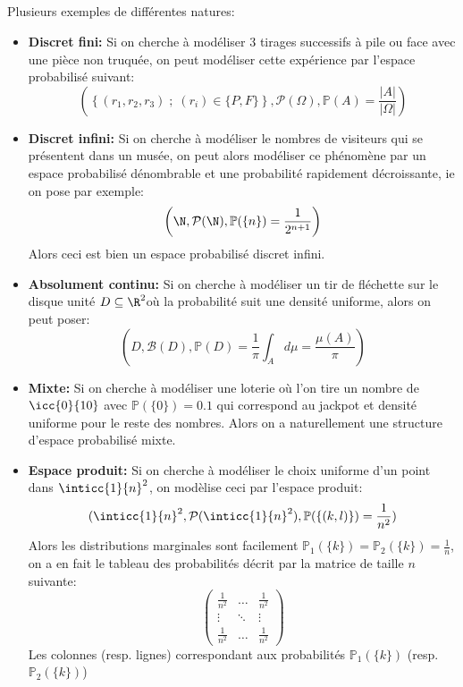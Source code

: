 \subsection*{}
Plusieurs exemples de différentes natures:
\begin{itemize}
   \item \textbf{Discret fini:} Si on cherche à modéliser 3 tirages successifs à pile ou face avec une pièce non truquée, on peut modéliser cette expérience par l'espace probabilisé suivant:
   \[ 
      \left(\left\{ (r_1, r_2, r_3) \; ; \; (r_i) \in \{P, F\}\right\}, \mathcal{P}( \Omega), \mathbb{P}(A) = \frac{|A|}{| \Omega|} \right)
   \]
   \item  \textbf{Discret infini:} Si on cherche à modéliser le nombres de visiteurs qui se présentent dans un musée, on peut alors modéliser ce phénomène par un espace probabilisé dénombrable et une probabilité rapidement décroissante, ie on pose par exemple:
   \[ 
      \left(\N, \mathcal{P}( \N), \mathbb{P}(\{n\}) = \frac{1}{2^{n+1}  } \right)
   \]
   Alors ceci est bien un espace probabilisé discret infini.
   \item \textbf{Absolument continu:} Si on cherche à modéliser un tir de fléchette sur le disque unité \( D \subseteq \R^2 \)où la probabilité suit une densité uniforme, alors on peut poser:
   \[ 
      \left( D, \mathcal{B}(D), \mathbb{P}(D) = \frac{1}{ \pi}\int_A d \mu = \frac{ \mu(A)}{ \pi}\right)
   \]
   \item \textbf{Mixte:} Si on cherche à modéliser une loterie où l'on tire un nombre de \( \icc{0}{10} \) avec \( \mathbb{P}(\{0\}) = 0.1 \) qui correspond au jackpot et densité uniforme pour le reste des nombres. Alors on a naturellement une structure d'espace probabilisé mixte.
   \item \textbf{Espace produit:} Si on cherche à modéliser le choix uniforme d'un point dans \( \inticc{1}{n}^2 \), on modèlise ceci par l'espace produit:
   \[ 
      (\inticc{1}{n}^2, \mathcal{P}(\inticc{1}{n}^2), \mathbb{P}(\{(k, l)\}) = \frac{1}{n^2}) 
   \]
   Alors les distributions marginales sont facilement \( \mathbb{P}_1(\{k\}) = \mathbb{P}_2(\{k\}) = \frac{1}{n} \), on a en fait le tableau des probabilités décrit par la matrice de taille \( n \) suivante:
   \[ 
      \begin{pmatrix}                   
         \frac{1}{n^2} & \ldots & \frac{1}{n^2}\\
         \vdots & \ddots & \vdots\\
         \frac{1}{n^2} & \ldots & \frac{1}{n^2}
      \end{pmatrix}
   \]
   Les colonnes (resp. lignes) correspondant aux probabilités \( \mathbb{P}_1(\{k\}) \) (resp. \( \mathbb{P}_2(\{k\}) \))
\end{itemize}
